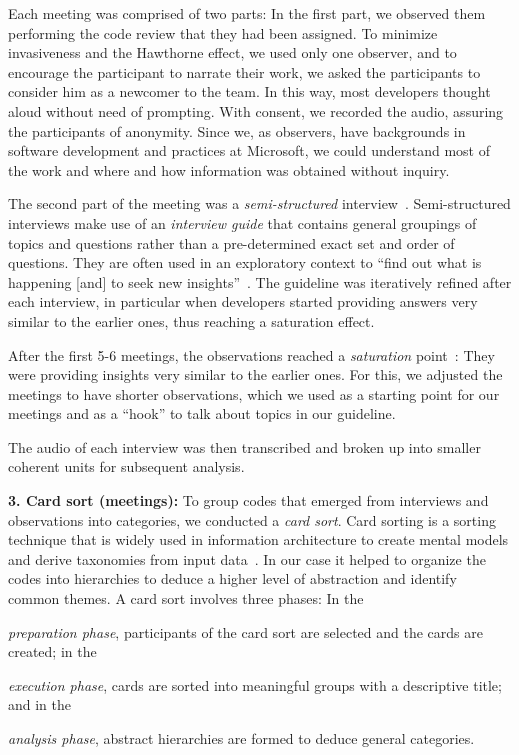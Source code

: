 Each meeting was comprised of two parts: In the first part, we observed them
performing the code review that they had been assigned. To minimize
invasiveness and the Hawthorne effect, we used only one observer, and to encourage the participant to
narrate their work, we asked the participants to consider him as a newcomer to
the team. In this way, most developers thought aloud without need of prompting.
With consent, we recorded the audio, assuring the participants of anonymity.
Since we, as observers, have backgrounds in software development and practices
at Microsoft, we could understand most of the work and where and how
information was obtained without inquiry. 

The second part of the meeting was a \emph{semi-structured} interview~\cite{taylor2010qualitative}. Semi-structured interviews make use of an \emph{interview guide} that
contains general groupings of topics and questions rather than a pre-determined
exact set and order of questions.  They are often used in an exploratory
context to ``find out what is happening [and] to seek new insights''~\cite{weiss1995learning}. 
The guideline was iteratively refined after each interview, in
particular when developers started providing answers very similar to the
earlier ones, thus reaching a saturation effect.

After the first 5-6 meetings, the observations reached a \emph{saturation} point~\cite{Glas1998a}: They were providing insights very similar to the earlier ones. For this, we adjusted the meetings to have shorter observations, which we used as a starting point for our meetings and as a ``hook'' to talk about topics in our guideline.

The audio of each interview was then transcribed and broken up into smaller
coherent units for subsequent analysis.

\textbf{3. Card sort (meetings):} To group codes that emerged from interviews and
observations into categories, we conducted a \emph{card sort}. Card sorting is a
sorting technique that is widely used in information architecture to create
mental models and derive taxonomies from input data~\cite{barker2005online}. In our case
it helped to organize the codes into hierarchies to deduce a higher level of
abstraction and identify common themes. A card sort involves three phases: In
the \begin{inparaenum}[(1)]
\item \emph{preparation phase}, participants of the card sort are selected and the
cards are created; in the 
\item \emph{execution phase}, cards are sorted into meaningful
groups with a descriptive title; and in the 
\item \emph{analysis phase}, abstract hierarchies are formed to deduce general categories.
\end{inparaenum}

